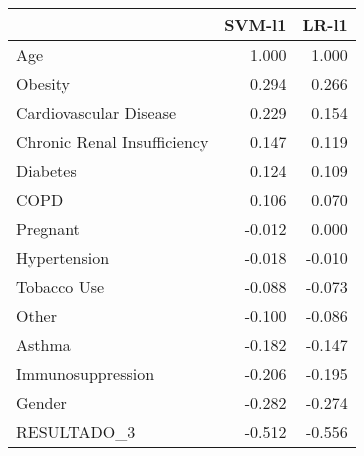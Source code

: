 \begin{tabular}{lrr}
\toprule
{} &  SVM-l1 &  LR-l1 \\
\midrule
Age                         &   1.000 &  1.000 \\
Obesity                     &   0.294 &  0.266 \\
Cardiovascular Disease      &   0.229 &  0.154 \\
Chronic Renal Insufficiency &   0.147 &  0.119 \\
Diabetes                    &   0.124 &  0.109 \\
COPD                        &   0.106 &  0.070 \\
Pregnant                    &  -0.012 &  0.000 \\
Hypertension                &  -0.018 & -0.010 \\
Tobacco Use                 &  -0.088 & -0.073 \\
Other                       &  -0.100 & -0.086 \\
Asthma                      &  -0.182 & -0.147 \\
Immunosuppression           &  -0.206 & -0.195 \\
Gender                      &  -0.282 & -0.274 \\
RESULTADO\_3                 &  -0.512 & -0.556 \\
\bottomrule
\end{tabular}
